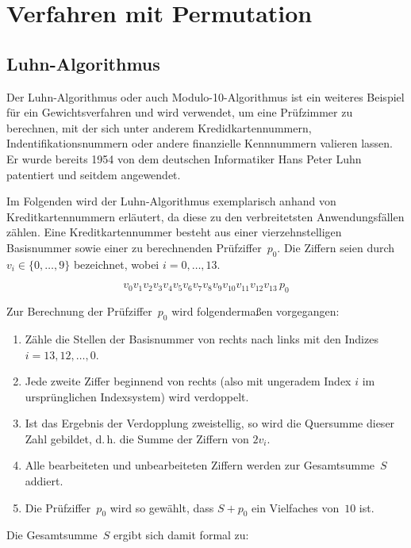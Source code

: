 
\section{Verfahren mit Permutation}
\subsection{Luhn-Algorithmus}

Der Luhn-Algorithmus oder auch Modulo-10-Algorithmus ist ein weiteres Beispiel für ein Gewichtsverfahren und wird verwendet, um eine Prüfzimmer zu berechnen, mit der sich unter anderem Kredidkartennummern, Indentifikationsnummern oder andere finanzielle Kennnummern valieren lassen.
Er wurde bereits 1954 von dem deutschen Informatiker Hans Peter Luhn patentiert und seitdem angewendet. 

Im Folgenden wird der Luhn-Algorithmus exemplarisch anhand von Kreditkartennummern erläutert, da diese zu den verbreitetsten Anwendungsfällen zählen. Eine Kreditkartennummer besteht aus einer vierzehnstelligen Basisnummer sowie einer zu berechnenden Prüfziffer~$p_0$. Die Ziffern seien durch $v_i \in \{0, \dots, 9\}$ bezeichnet, wobei $i = 0, \dots, 13$.

\begin{equation}
\label{eq:Luhn}
v_0 v_1 v_2 v_3 v_4 v_5 v_6 v_7 v_8 v_9 v_{10} v_{11} v_{12} v_{13} \, p_0
\end{equation}

Zur Berechnung der Prüfziffer~$p_0$ wird folgendermaßen vorgegangen:

\begin{enumerate}
  \item Zähle die Stellen der Basisnummer von rechts nach links mit den Indizes $i = 13, 12, \dots, 0$.
  \item Jede zweite Ziffer beginnend von rechts (also mit ungeradem Index $i$ im ursprünglichen Indexsystem) wird verdoppelt.
  \item Ist das Ergebnis der Verdopplung zweistellig, so wird die Quersumme dieser Zahl gebildet, d.\,h. die Summe der Ziffern von $2v_i$.
  \item Alle bearbeiteten und unbearbeiteten Ziffern werden zur Gesamtsumme~$S$ addiert.
  \item Die Prüfziffer~$p_0$ wird so gewählt, dass $S + p_0$ ein Vielfaches von~$10$ ist.
\end{enumerate}

Die Gesamtsumme~$S$ ergibt sich damit formal zu:

